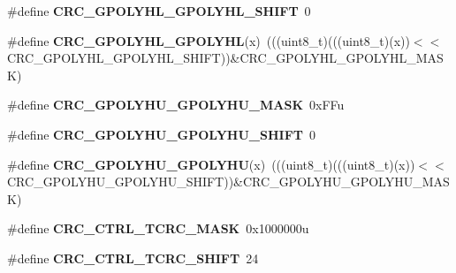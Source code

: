 \begin{DoxyCompactItemize}
\item 
\#define {\bfseries C\+R\+C\+\_\+\+G\+P\+O\+L\+Y\+H\+L\+\_\+\+G\+P\+O\+L\+Y\+H\+L\+\_\+\+S\+H\+I\+FT}~0\hypertarget{group__CRC__Register__Masks_gaffbf0c35e87ea7a9650c9a049a08560c}{}\label{group__CRC__Register__Masks_gaffbf0c35e87ea7a9650c9a049a08560c}

\item 
\#define {\bfseries C\+R\+C\+\_\+\+G\+P\+O\+L\+Y\+H\+L\+\_\+\+G\+P\+O\+L\+Y\+HL}(x)~(((uint8\+\_\+t)(((uint8\+\_\+t)(x))$<$$<$C\+R\+C\+\_\+\+G\+P\+O\+L\+Y\+H\+L\+\_\+\+G\+P\+O\+L\+Y\+H\+L\+\_\+\+S\+H\+I\+FT))\&C\+R\+C\+\_\+\+G\+P\+O\+L\+Y\+H\+L\+\_\+\+G\+P\+O\+L\+Y\+H\+L\+\_\+\+M\+A\+SK)\hypertarget{group__CRC__Register__Masks_ga2620d4495edbf2e97ad905e12bf3e0a5}{}\label{group__CRC__Register__Masks_ga2620d4495edbf2e97ad905e12bf3e0a5}

\item 
\#define {\bfseries C\+R\+C\+\_\+\+G\+P\+O\+L\+Y\+H\+U\+\_\+\+G\+P\+O\+L\+Y\+H\+U\+\_\+\+M\+A\+SK}~0x\+F\+Fu\hypertarget{group__CRC__Register__Masks_gac0f3f7a896e1ef279b948d778274cf04}{}\label{group__CRC__Register__Masks_gac0f3f7a896e1ef279b948d778274cf04}

\item 
\#define {\bfseries C\+R\+C\+\_\+\+G\+P\+O\+L\+Y\+H\+U\+\_\+\+G\+P\+O\+L\+Y\+H\+U\+\_\+\+S\+H\+I\+FT}~0\hypertarget{group__CRC__Register__Masks_ga448d4b6c4e930f1c84294da6607faac4}{}\label{group__CRC__Register__Masks_ga448d4b6c4e930f1c84294da6607faac4}

\item 
\#define {\bfseries C\+R\+C\+\_\+\+G\+P\+O\+L\+Y\+H\+U\+\_\+\+G\+P\+O\+L\+Y\+HU}(x)~(((uint8\+\_\+t)(((uint8\+\_\+t)(x))$<$$<$C\+R\+C\+\_\+\+G\+P\+O\+L\+Y\+H\+U\+\_\+\+G\+P\+O\+L\+Y\+H\+U\+\_\+\+S\+H\+I\+FT))\&C\+R\+C\+\_\+\+G\+P\+O\+L\+Y\+H\+U\+\_\+\+G\+P\+O\+L\+Y\+H\+U\+\_\+\+M\+A\+SK)\hypertarget{group__CRC__Register__Masks_ga3a5bf9b2f9fae47e0e669010c130ade2}{}\label{group__CRC__Register__Masks_ga3a5bf9b2f9fae47e0e669010c130ade2}

\item 
\#define {\bfseries C\+R\+C\+\_\+\+C\+T\+R\+L\+\_\+\+T\+C\+R\+C\+\_\+\+M\+A\+SK}~0x1000000u\hypertarget{group__CRC__Register__Masks_gad441a2b8f6300b71038d47cc3c8c0fcc}{}\label{group__CRC__Register__Masks_gad441a2b8f6300b71038d47cc3c8c0fcc}

\item 
\#define {\bfseries C\+R\+C\+\_\+\+C\+T\+R\+L\+\_\+\+T\+C\+R\+C\+\_\+\+S\+H\+I\+FT}~24\hypertarget{group__CRC__Register__Masks_ga7c3cc17a7bc8f6c0621f3ce91e7b2b3e}{}\label{group__CRC__Register__Masks_ga7c3cc17a7bc8f6c0621f3ce91e7b2b3e}


\end{DoxyCompactItemize}
